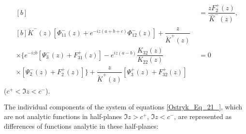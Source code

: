 \begin{equation}
\begin{aligned}
\begin{multlined}[b]
	\end{multlined} &=\dfrac{zF_{2}^{+} (z)}{\hat{K}^{-} (z)} ,
	\\ 
	\begin{multlined}[b]
		\breve{K}^{-} (z)\left[\Phi _{11}^{-} (z)+e^{-iz(a+b+c)} \Phi _{12}^{-} (z)\right]+\dfrac{z}{\breve{K}^{+} (z)}
		\\
		\times\bigg\{e^{-izb} \left[\Psi _{3}^{-} (z)+F_{31}^{+} (z)\right] -e^{iz(a-b)} \dfrac{K_{32} (z)}{K_{22} (z)} 
		\\
		\times\left[\Psi _{2}^{-} (z)+F_{2}^{+} (z)\right]\bigg\}+\dfrac{z}{\breve{K}^{+} (z)} \left[\Psi _{3}^{+} (z)+F_{32}^{+} (z)\right]
	\end{multlined} &=0 
\end{aligned}
\end{equation}
($c^{+} <\Im z<c^{-}$).  


The individual components of the system of equations \eqref{Ostryk_Eq_21_}, which are not analytic functions in half-planes $\Im z>c^{+} $, $\Im z<c^{-} $, are represented as differences of functions analytic in these half-planes:

